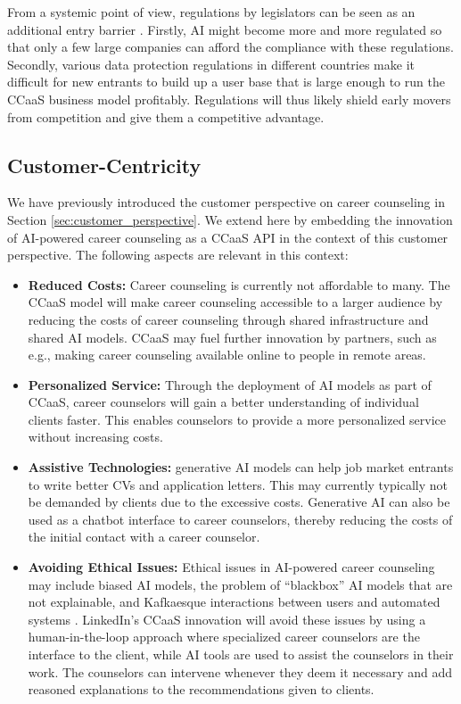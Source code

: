 From a systemic point of view, regulations by legislators can be seen as an additional entry barrier
\citep{kaserAIpoweredCareerCounseling2023}. Firstly, AI might become more and more regulated so that 
only a few large companies can afford the compliance with these regulations. Secondly, various data protection
regulations in different countries make it difficult for new entrants to build up a user base that is large enough
to run the CCaaS business model profitably. Regulations will thus likely shield early movers from competition
and give them a competitive advantage.

\subsection{Customer-Centricity}

We have previously introduced the customer perspective on career counseling in Section \ref{sec:customer_perspective}.
We extend here by embedding the innovation of AI-powered career counseling as a CCaaS API in the context of this 
customer perspective. The following aspects are relevant in this context:

\begin{itemize}
    \item \textbf{Reduced Costs:} Career counseling is currently not affordable to many. The CCaaS model
        will make career counseling accessible to a larger audience by reducing the costs of career
        counseling through shared infrastructure and shared AI models. CCaaS may fuel further innovation by 
        partners, such as e.g., making career counseling available online to people in remote areas.
    \item \textbf{Personalized Service:} Through the deployment of AI models as part of CCaaS, career counselors 
        will gain a better understanding of individual clients faster. This enables counselors to provide
        a more personalized service without increasing costs.
    \item \textbf{Assistive Technologies:} generative AI models can help job market entrants to write better CVs
        and application letters. This may currently typically not be demanded by clients due to the excessive costs.
        Generative AI can also be used as a chatbot interface to career counselors, thereby reducing the costs
        of the initial contact with a career counselor.
    \item \textbf{Avoiding Ethical Issues:} Ethical issues in AI-powered career counseling may include biased AI
        models, the problem of ``blackbox'' AI models that are not explainable, and Kafkaesque interactions between
        users and automated systems \citep{kaserAIpoweredCareerCounseling2023}. LinkedIn's CCaaS innovation will avoid 
        these issues by using a human-in-the-loop approach where specialized career counselors are the interface 
        to the client, while AI tools are used to assist the counselors in their work. The counselors can intervene
        whenever they deem it necessary and add reasoned explanations to the recommendations given to clients.
\end{itemize}

